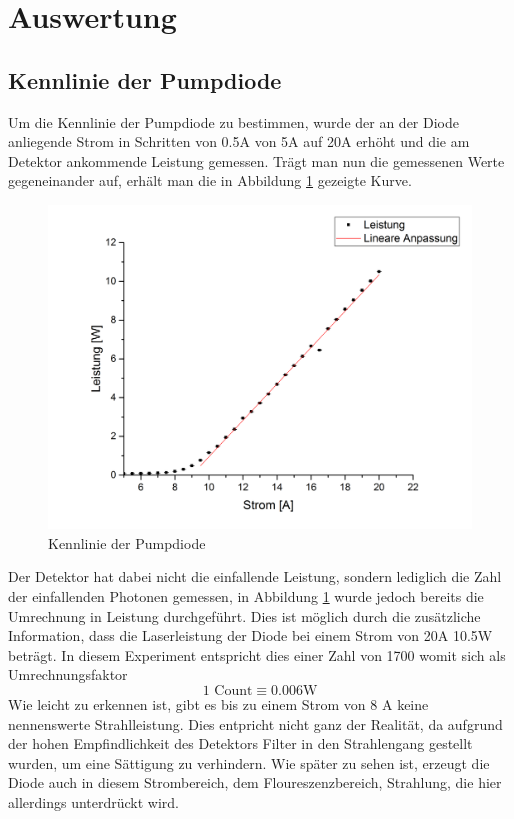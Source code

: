 \section{Auswertung}
\subsection{Kennlinie der Pumpdiode}
\label{diode}
Um die Kennlinie der Pumpdiode zu bestimmen, wurde der an der Diode anliegende Strom in Schritten von 0.5A von 5A auf 20A erhöht und die am Detektor ankommende Leistung gemessen. \newline
Trägt man nun die gemessenen Werte gegeneinander auf, erhält man die in Abbildung \ref{kennpump} gezeigte Kurve.
\begin{figure}[H]
	    \centering
		\includegraphics[scale=.5]{Bilder/Pumplaser.png}
		\caption{Kennlinie der Pumpdiode}
		\label{kennpump}
\end{figure}
Der Detektor hat dabei nicht die einfallende Leistung, sondern lediglich die Zahl der einfallenden Photonen gemessen, in Abbildung \ref{kennpump} wurde jedoch bereits die Umrechnung in Leistung durchgeführt. Dies ist möglich durch die zusätzliche Information, dass die Laserleistung der Diode bei einem Strom von 20A 10.5W beträgt. In diesem Experiment entspricht dies einer Zahl von 1700 womit sich als Umrechnungsfaktor
\begin{equation}
1 \text{ Count}\equiv 0.006\text{W}
\end{equation}
Wie leicht zu erkennen ist, gibt es bis zu einem Strom von 8 A keine nennenswerte Strahlleistung. Dies entpricht nicht ganz der Realität, da aufgrund der hohen Empfindlichkeit des Detektors Filter in den Strahlengang gestellt wurden, um eine Sättigung zu verhindern. Wie später zu sehen ist, erzeugt die Diode auch in diesem Strombereich, dem Floureszenzbereich, Strahlung, die hier allerdings unterdrückt wird.  \newline
